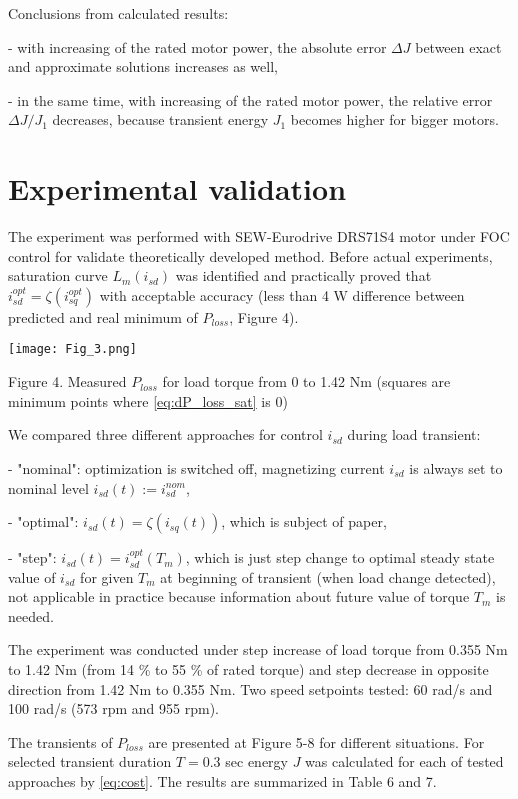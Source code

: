 \documentclass[journal]{IEEEtran}
\begin{document}
Conclusions from calculated results:

- with increasing of the rated motor power, the absolute error $\Delta J$ between exact and approximate solutions increases as well,

- in the same time, with increasing of the rated motor power, the relative error $\Delta J/J_1$ decreases, because transient energy $J_1$ becomes higher for bigger motors.


\section{Experimental validation}

The experiment was performed with SEW-Eurodrive DRS71S4 motor under FOC control for validate theoretically developed method. Before actual experiments, saturation curve $L_m(i_{sd})$ was identified and practically proved that $i_{sd}^{opt} = \zeta(i_{sq}^{opt})$ with acceptable accuracy (less than 4 W difference between predicted and real minimum of $P_{loss}$, Figure 4).

\begin{center}
\ifpdf \texttt{[image: Fig\_3.png]}
\fi

Figure 4. Measured $P_{loss}$ for load torque from 0 to 1.42 Nm (squares are minimum points where \eqref{eq:dP_loss_sat} is 0)
\end{center}

We compared three different approaches for control $i_{sd}$ during load transient:

- "nominal": optimization is switched off, magnetizing current $i_{sd}$ is always set to nominal level $i_{sd}(t) := i_{sd}^{nom}$,

- "optimal": $i_{sd}(t) = \zeta(i_{sq}(t))$, which is subject of paper,

- "step": $i_{sd}(t) = i_{sd}^{opt}(T_m)$, which is just step change to optimal steady state value of $i_{sd}$ for given $T_m$ at beginning of transient (when load change detected), not applicable in practice because information about future value of torque $T_m$ is needed.

The experiment was conducted under step increase of load torque from 0.355 Nm to 1.42 Nm (from 14 \% to 55 \% of rated torque) and step decrease in opposite direction from 1.42 Nm to 0.355 Nm. Two speed setpoints tested: 60 rad/s and 100 rad/s (573 rpm and 955 rpm).

The transients of $P_{loss}$ are presented at Figure 5-8 for different situations. For selected transient duration $T = 0.3$ sec energy $J$ was calculated for each of tested approaches by \eqref{eq:cost}. The results are summarized in Table 6 and 7.
\end{document}
